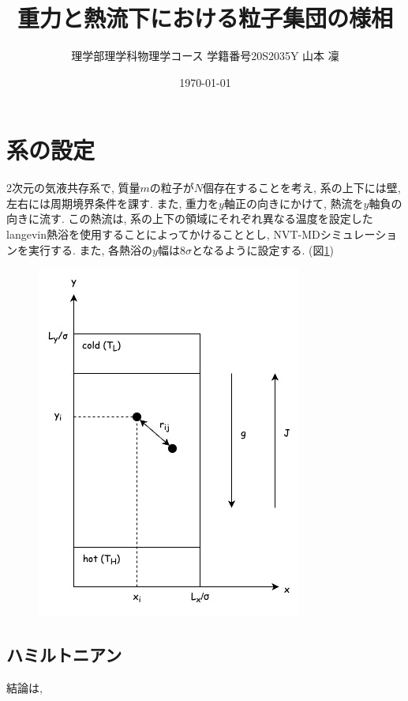\documentclass[dvipdfmx]{jsarticle}
\numberwithin{equation}{subsection}
\begin{document}
\title{重力と熱流下における粒子集団の様相}
\author{理学部理学科物理学コース 学籍番号20S2035Y 山本 凜}
\date{\today}
\maketitle
\newpage
\setcounter{tocdepth}{3}
\tableofcontents
\newpage

\section{系の設定}

2次元の気液共存系で, 質量$m$の粒子が$N$個存在することを考え, 系の上下には壁, 左右には周期境界条件を課す. また, 重力を$y$軸正の向きにかけて, 熱流を$y$軸負の向きに流す. この熱流は, 系の上下の領域にそれぞれ異なる温度を設定したlangevin熱浴を使用することによってかけることとし, NVT-MDシミュレーションを実行する. また, 各熱浴の$y$幅は$8\sigma$となるように設定する. (図\ref{fig:system})


\begin{figure}[H]
  \centering
  \caption{}
  \label{fig:system}
  \includegraphics[scale=0.7]{image/system.jpg}
\end{figure}

\subsection{ハミルトニアン}

結論は, 
\end{document}
